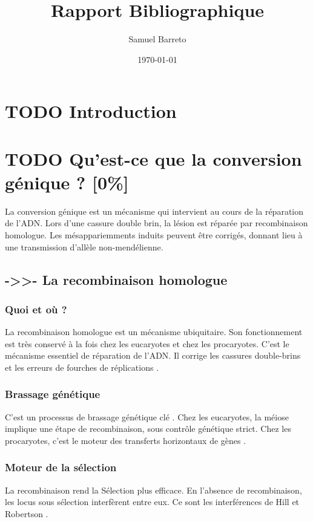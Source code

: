 \documentclass[11pt]{scrartcl}
\author{Samuel Barreto}
\date{\today}
\title{Rapport Bibliographique}
\begin{document}
\maketitle

\section{{\bfseries\sffamily TODO} Introduction}
\label{sec-1}
\section{{\bfseries\sffamily TODO} Qu'est-ce que la conversion génique ? [0\%]}
\label{sec-2}

La conversion génique est un mécanisme qui intervient au cours de la réparation
de l'ADN. Lors d'une cassure double brin, la lésion est réparée par
recombinaison homologue. Les mésappariemments induits peuvent être corrigés,
donnant lieu à une transmission d'allèle non-mendélienne. 

\subsection{{\bfseries\sffamily ->>-} La recombinaison homologue}
\label{sec-2-1}

\subsubsection{Quoi et où ?}
\label{sec-2-1-1}
La recombinaison homologue est un mécanisme ubiquitaire. Son fonctionnement est
très conservé à la fois chez les eucaryotes et chez les procaryotes. C'est le
mécanisme essentiel de réparation de l'ADN. Il corrige les cassures double-brins
et les erreurs de fourches de réplications \cite{lusetti_bacterial_2002}. 


\subsubsection{Brassage génétique}
\label{sec-2-1-2}
C'est un processus de brassage génétique clé \cite{webster_direct_2012}. Chez les
eucaryotes, la méiose implique une étape de recombinaison, sous contrôle
génétique strict. Chez les procaryotes, c'est le moteur des transferts
horizontaux de gènes \cite{didelot_impact_2010}.

\subsubsection{Moteur de la sélection}
\label{sec-2-1-3}
La recombinaison rend la Sélection plus efficace. En l'absence de recombinaison,
les locus sous sélection interfèrent entre eux. Ce sont les interférences de
Hill et Robertson \cite{hill_effect_1966}. 
\end{document}
